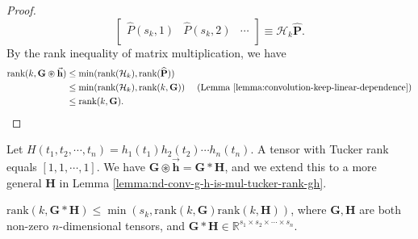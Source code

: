 \documentclass[twoside,11pt]{article}
\def\oconv{\circledast}
\def\rank{\text{rank}}
\def\tvar#1{\mathbf{#1}} %
\def\tvarhat#1{\widehat{\mathbf{#1}}} %
\def\vsymb#1{\vec{\mathbf{#1}}}
\begin{document}
\begin{proof}
\begin{equation*}
\begin{bmatrix}
        \hat{P}(s_k, 1) & \hat{P}(s_k, 2) & \cdots \\
      \end{bmatrix}
      \equiv \mathcal{H}_k \tvarhat{P}.
    \end{equation*}
    By the rank inequality of matrix multiplication, we have
    \begin{equation*}
      \begin{aligned}
        \rank(k, \tvar{G} \oconv \vsymb{h})
         & \le \min(\rank(\mathcal{H}_k), \rank(\tvarhat{P}))                                                                   \\
         & \le \min(\rank(\mathcal{H}_k), \rank(k, \tvar{G})) ~~~~(\text{Lemma \ref{lemma:convolution-keep-linear-dependence}}) \\
         & \le \rank(k, \tvar{G}).
      \end{aligned}
    \end{equation*}
  
\end{proof}


  Let \(H(t_1, t_2, \cdots, t_n) = h_1(t_1) h_2(t_2) \cdots h_n(t_n)\). A tensor with Tucker rank equals \([1, 1, \cdots, 1]\). We have
  \(\tvar{G} \oconv \vsymb{h} = \tvar{G} * \tvar{H}\), and we extend this to a more general \(\tvar{H}\) in Lemma \ref{lemma:nd-conv-g-h-is-mul-tucker-rank-gh}.


\begin{lemma}
  \(\rank(k, \tvar{G} * \tvar{H}) \le \min(s_k, \rank(k,\tvar{G}) \rank(k,\tvar{H}))\), where \(\tvar{G}, \tvar{H}\) are both non-zero \(n\)-dimensional tensors, and \(\tvar{G} * \tvar{H} \in \mathbb{R}^{s_1 \times s_2 \times \cdots \times s_n}\).
  \label{lemma:nd-conv-g-h-is-mul-tucker-rank-gh}
\end{lemma}
\end{document}
